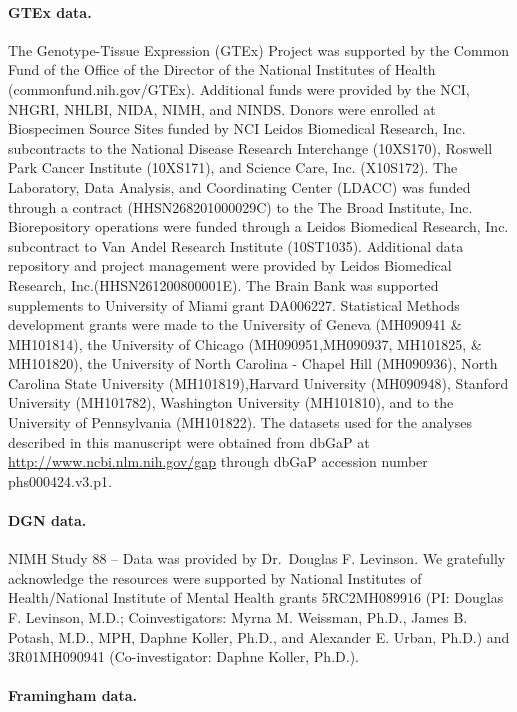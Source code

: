 \documentclass[10pt,letterpaper]{article}
\begin{document}
\paragraph{GTEx data.}\label{gtex-data}

The Genotype-Tissue Expression (GTEx) Project was supported by the
Common Fund of the Office of the Director of the National Institutes of
Health (commonfund.nih.gov/GTEx). Additional funds were provided by the
NCI, NHGRI, NHLBI, NIDA, NIMH, and NINDS. Donors were enrolled at
Biospecimen Source Sites funded by NCI Leidos Biomedical Research, Inc.
subcontracts to the National Disease Research Interchange (10XS170),
Roswell Park Cancer Institute (10XS171), and Science Care, Inc.
(X10S172). The Laboratory, Data Analysis, and Coordinating Center
(LDACC) was funded through a contract (HHSN268201000029C) to the The
Broad Institute, Inc. Biorepository operations were funded through a
Leidos Biomedical Research, Inc. subcontract to Van Andel Research
Institute (10ST1035). Additional data repository and project management
were provided by Leidos Biomedical Research, Inc.(HHSN261200800001E).
The Brain Bank was supported supplements to University of Miami grant
DA006227. Statistical Methods development grants were made to the
University of Geneva (MH090941 \& MH101814), the University of Chicago
(MH090951,MH090937, MH101825, \& MH101820), the University of North
Carolina - Chapel Hill (MH090936), North Carolina State University
(MH101819),Harvard University (MH090948), Stanford University
(MH101782), Washington University (MH101810), and to the University of
Pennsylvania (MH101822). The datasets used for the analyses described in
this manuscript were obtained from dbGaP at
\url{http://www.ncbi.nlm.nih.gov/gap} through dbGaP accession number
phs000424.v3.p1.

\paragraph{DGN data.}\label{dgn-data}

NIMH Study 88 -- Data was provided by
Dr.~Douglas F. Levinson. We gratefully acknowledge the resources were
supported by National Institutes of Health/National Institute of Mental
Health grants 5RC2MH089916 (PI: Douglas F. Levinson, M.D.;
Coinvestigators: Myrna M. Weissman, Ph.D., James B. Potash, M.D., MPH,
Daphne Koller, Ph.D., and Alexander E. Urban, Ph.D.) and 3R01MH090941
(Co-investigator: Daphne Koller, Ph.D.).

\paragraph{Framingham data.}
\end{document}
